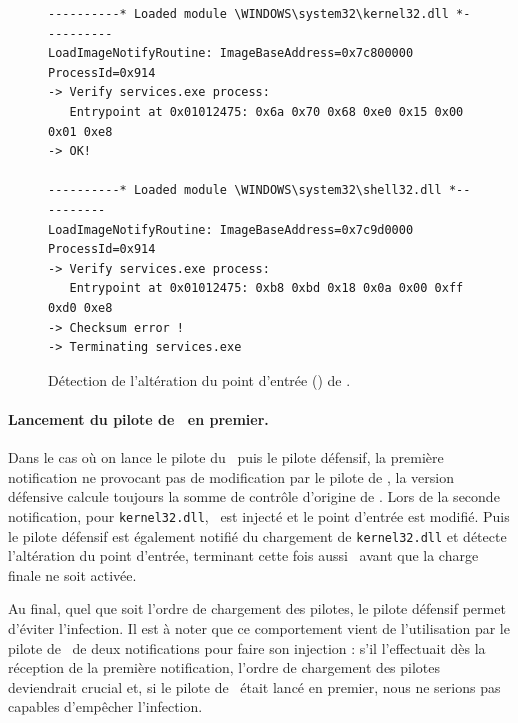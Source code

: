 \begin{figure}[h]
\begin{center}
\scriptsize
\lstset{
  xleftmargin=.1\textwidth, xrightmargin=.1\textwidth
}
\begin{lstlisting}[language={}]
----------* Loaded module \WINDOWS\system32\kernel32.dll *----------
LoadImageNotifyRoutine: ImageBaseAddress=0x7c800000 ProcessId=0x914 
-> Verify services.exe process: 
   Entrypoint at 0x01012475: 0x6a 0x70 0x68 0xe0 0x15 0x00 0x01 0xe8
-> OK!

----------* Loaded module \WINDOWS\system32\shell32.dll *----------
LoadImageNotifyRoutine: ImageBaseAddress=0x7c9d0000 ProcessId=0x914 
-> Verify services.exe process:
   Entrypoint at 0x01012475: 0xb8 0xbd 0x18 0x0a 0x00 0xff 0xd0 0xe8
-> Checksum error !
-> Terminating services.exe
\end{lstlisting}
\end{center}
\caption{Détection de l'altération du point d'entrée () de \services.\label{fig:Breakpoint2}}
\end{figure}

\paragraph{Lancement du pilote de \duqu\ en premier.}
Dans le cas où on lance le pilote du \duqu\ puis le pilote défensif, la première notification ne provocant pas de modification par le pilote de \duqu, la version défensive calcule toujours la somme de contrôle d'origine de \services.
Lors de la seconde notification, pour \texttt{kernel32.dll}, \duqu\ est injecté et le point d'entrée est modifié. Puis le pilote défensif est également notifié du chargement de \texttt{kernel32.dll} et détecte l'altération du point d'entrée, terminant cette fois aussi \services\ avant que la charge finale ne soit activée.

Au final, quel que soit l'ordre de chargement des pilotes, le pilote défensif permet d'éviter l'infection.
Il est à noter que ce comportement vient de l'utilisation par le pilote de \duqu\ de deux notifications pour faire son injection : s'il l'effectuait dès la réception de la première notification, l'ordre de chargement des pilotes deviendrait crucial et, si le pilote de \duqu\ était lancé en premier, nous ne serions pas capables d'empêcher l'infection.

